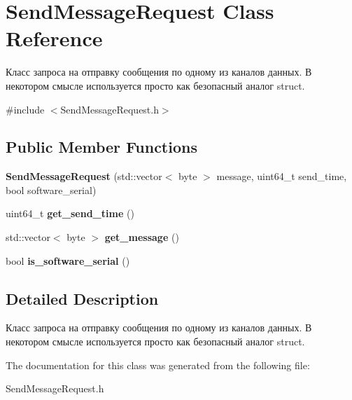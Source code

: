 \hypertarget{classSendMessageRequest}{}\section{Send\+Message\+Request Class Reference}
\label{classSendMessageRequest}


Класс запроса на отправку сообщения по одному из каналов данных.  В некотором смысле используется просто как безопасный аналог struct.  




{\ttfamily \#include $<$Send\+Message\+Request.\+h$>$}

\subsection*{Public Member Functions}
\begin{DoxyCompactItemize}
\item 
\mbox{\label{classSendMessageRequest_a95d1d5f9f5ba86cd19f7cf8ff4ac4f47}} 
{\bfseries Send\+Message\+Request} (std\+::vector$<$ byte $>$ message, uint64\+\_\+t send\+\_\+time, bool software\+\_\+serial)
\item 
\mbox{\label{classSendMessageRequest_a437a9ee34d56ccf83474995cea676bef}} 
uint64\+\_\+t {\bfseries get\+\_\+send\+\_\+time} ()
\item 
\mbox{\label{classSendMessageRequest_a3ffcb2a4b80b82ed3ec42c2cc373c966}} 
std\+::vector$<$ byte $>$ {\bfseries get\+\_\+message} ()
\item 
\mbox{\label{classSendMessageRequest_a54501a4ff0346ad99921dda990ffa179}} 
bool {\bfseries is\+\_\+software\+\_\+serial} ()
\end{DoxyCompactItemize}


\subsection{Detailed Description}
Класс запроса на отправку сообщения по одному из каналов данных.  В некотором смысле используется просто как безопасный аналог struct. 

The documentation for this class was generated from the following file\+:\begin{DoxyCompactItemize}
\item 
Send\+Message\+Request.\+h\end{DoxyCompactItemize}
